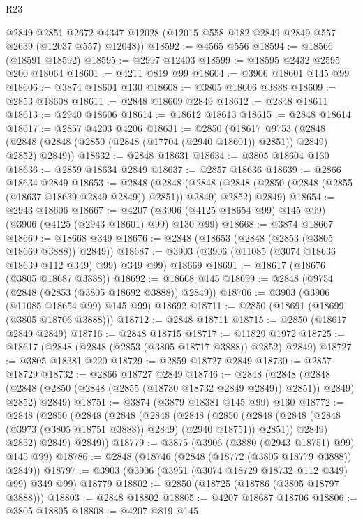 \begin{lexlean}{R23}
\begin{coremodule}
      @2849
      @2851
      @2672
      @4347
      @12028
      (@12015 @558 @182 @2849 @2849 @557 @2639 (@12037 @557) @12048))
@18592 := @4565 @556
@18594 := @18566 (@18591 @18592)
@18595 := @2997 @12403
@18599 := @18595 @2432 @2595 @200 @18064
@18601 := @4211 @819 @99
@18604 := @3906 @18601 @145 @99
@18606 := @3874 @18604 @130
@18608 := @3805 @18606 @3888
@18609 := @2853 @18608
@18611 := @2848 @18609 @2849
@18612 := @2848 @18611
@18613 := @2940 @18606
@18614 := @18612 @18613
@18615 := @2848 @18614
@18617 := @2857 @4203 @4206
@18631 := @2850
    (@18617
      @9753
      (@2848 (@2848 (@2848 (@2850 (@2848 (@17704 (@2940 @18601)) @2851)) @2849) @2852) @2849))
@18632 := @2848 @18631
@18634 := @3805 @18604 @130
@18636 := @2859 @18634 @2849
@18637 := @2857 @18636
@18639 := @2866 @18634 @2849
@18653 := @2848
    (@2848
      (@2848 (@2848 (@2850 (@2848 (@2855 (@18637 @18639 @2849 @2849)) @2851)) @2849) @2852)
      @2849)
@18654 := @2943 @18606
@18667 := @4207 (@3906 (@4125 @18654 @99) @145 @99) (@3906 (@4125 (@2943 @18601) @99) @130 @99)
@18668 := @3874 @18667
@18669 := @18668 @349
@18676 := @2848 (@18653 (@2848 (@2853 (@3805 @18669 @3888)) @2849))
@18687 := @3903 (@3906 (@11085 (@3074 @18636 @18639 @112 @349) @99) @349 @99) @18669
@18691 := @18617 (@18676 (@3805 @18687 @3888))
@18692 := @18668 @145
@18699 := @2848 (@9754 (@2848 (@2853 (@3805 @18692 @3888)) @2849))
@18706 := @3903 (@3906 (@11085 @18654 @99) @145 @99) @18692
@18711 := @2850 (@18691 (@18699 (@3805 @18706 @3888)))
@18712 := @2848 @18711
@18715 := @2850 (@18617 @2849 @2849)
@18716 := @2848 @18715
@18717 := @11829 @1972
@18725 := @18617 (@2848 (@2848 (@2853 (@3805 @18717 @3888)) @2852) @2849)
@18727 := @3805 @18381 @220
@18729 := @2859 @18727 @2849
@18730 := @2857 @18729
@18732 := @2866 @18727 @2849
@18746 := @2848
    (@2848
      (@2848 (@2848 (@2850 (@2848 (@2855 (@18730 @18732 @2849 @2849)) @2851)) @2849) @2852)
      @2849)
@18751 := @3874 (@3879 @18381 @145 @99) @130
@18772 := @2848
    (@2850
      (@2848
        (@2848
          (@2848
            (@2848
              (@2850
                (@2848 (@2848 (@2848 (@3973 (@3805 @18751 @3888)) @2849) (@2940 @18751)) @2851))
              @2849)
            @2852)
          @2849)
        @2849))
@18779 := @3875 (@3906 (@3880 (@2943 @18751) @99) @145 @99)
@18786 := @2848 (@18746 (@2848 (@18772 (@3805 @18779 @3888)) @2849))
@18797 := @3903 (@3906 (@3951 (@3074 @18729 @18732 @112 @349) @99) @349 @99) @18779
@18802 := @2850 (@18725 (@18786 (@3805 @18797 @3888)))
@18803 := @2848 @18802
@18805 := @4207 @18687 @18706
@18806 := @3805 @18805
@18808 := @4207 @819 @145

\end{coremodule}
\end{lexlean}
